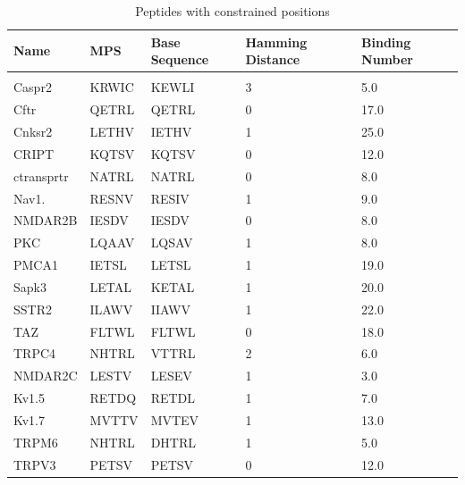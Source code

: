 \documentclass[a4paper, 12pt]{article}
\begin{document}
\begin{enumerate}
\begin{table}[!h]
\centering
\caption{Peptides with constrained positions}
\label{Zero_entopy peptides}
\begin{tabular}{lllll}
\hline
Name       & MPS   & Base Sequence & Hamming Distance & Binding Number \\ \hline
           &       &               &                  &                \\ \hline
Caspr2     & KRWIC & KEWLI         & 3                & 5.0            \\ \hline
Cftr       & QETRL & QETRL         & 0                & 17.0           \\ \hline
Cnksr2     & LETHV & IETHV         & 1                & 25.0           \\ \hline
CRIPT      & KQTSV & KQTSV         & 0                & 12.0           \\ \hline
ctransprtr & NATRL & NATRL         & 0                & 8.0            \\ \hline
Nav1.      & RESNV & RESIV         & 1                & 9.0            \\ \hline
NMDAR2B    & IESDV & IESDV         & 0                & 8.0            \\ \hline
PKC        & LQAAV & LQSAV         & 1                & 8.0            \\ \hline
PMCA1      & IETSL & LETSL         & 1                & 19.0           \\ \hline
Sapk3      & LETAL & KETAL         & 1                & 20.0           \\ \hline
SSTR2      & ILAWV & IIAWV         & 1                & 22.0           \\ \hline
TAZ        & FLTWL & FLTWL         & 0                & 18.0           \\ \hline
TRPC4      & NHTRL & VTTRL         & 2                & 6.0            \\ \hline
NMDAR2C    & LESTV & LESEV         & 1                & 3.0            \\ \hline
Kv1.5      & RETDQ & RETDL         & 1                & 7.0            \\ \hline
Kv1.7      & MVTTV & MVTEV         & 1                & 13.0           \\ \hline
TRPM6      & NHTRL & DHTRL         & 1                & 5.0            \\ \hline
TRPV3      & PETSV & PETSV         & 0                & 12.0           \\ \hline
\end{tabular}
\end{table}


\end{enumerate}
\end{document}
